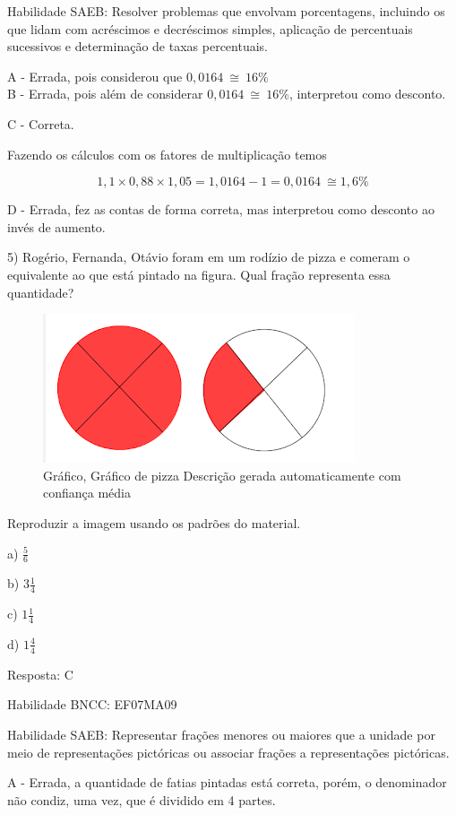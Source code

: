 Habilidade SAEB: Resolver problemas que envolvam porcentagens, incluindo
os que lidam com acréscimos e decréscimos simples, aplicação de
percentuais sucessivos e determinação de taxas percentuais.

A - Errada, pois considerou que \(0,0164\  \cong \ 16\%\)\\
B - Errada, pois além de considerar \(0,0164\  \cong \ 16\%\),
interpretou como desconto.

C - Correta.

Fazendo os cálculos com os fatores de multiplicação temos

\[1,1 \times 0,88 \times 1,05 = 1,0164 - 1 = 0,0164\  \cong 1,6\%\]

D - Errada, fez as contas de forma correta, mas interpretou como
desconto ao invés de aumento.

5) Rogério, Fernanda, Otávio foram em um rodízio de pizza e comeram o
equivalente ao que está pintado na figura. Qual fração representa essa
quantidade?

\begin{figure}
\centering
\includegraphics[width=3.625in,height=1.72917in]{./imgSAEB_7_MAT/media/image95.png}
\caption{Gráfico, Gráfico de pizza Descrição gerada automaticamente com
confiança média}
\end{figure}

Reproduzir a imagem usando os padrões do material.

a) \(\frac{5}{6}\)

b) \(3\frac{1}{4}\)

c) \(1\frac{1}{4}\)

d) \(1\frac{4}{4}\)

Resposta: C

Habilidade BNCC: EF07MA09

Habilidade SAEB: Representar frações menores ou maiores que a unidade
por meio de representações pictóricas ou associar frações a
representações pictóricas.

A - Errada, a quantidade de fatias pintadas está correta, porém, o
denominador não condiz, uma vez, que é dividido em 4 partes.

